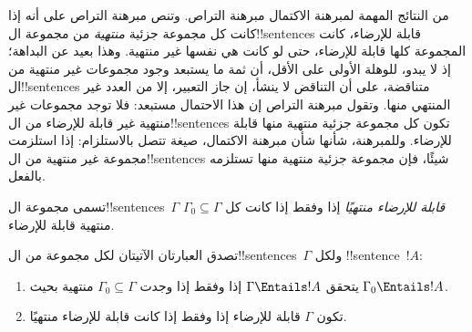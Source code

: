 \documentclass[../../../include/open-logic-section]{subfiles}
\begin{document}
      {}
      {}


من النتائج المهمة لمبرهنة الاكتمال مبرهنة التراص. وتنص مبرهنة التراص
على أنه إذا كانت كل مجموعة جزئية \emph{منتهية} من مجموعة ال!!{sentence}s
قابلة للإرضاء، كانت المجموعة كلها قابلة للإرضاء، حتى لو كانت هي نفسها
غير منتهية. وهذا بعيد عن البداهة؛ إذ لا يبدو، للوهلة الأولى على الأقل،
أن ثمة ما يستبعد وجود مجموعات غير منتهية من ال!!{sentence}s متناقضة،
على أن التناقض لا ينشأ، إن جاز التعبير، إلا من العدد غير المنتهي منها.
وتقول مبرهنة التراص إن هذا الاحتمال مستبعد: فلا توجد مجموعات غير منتهية
غير قابلة للإرضاء من ال!!{sentence}s تكون كل مجموعة جزئية منتهية منها
قابلة للإرضاء. وللمبرهنة، شأنها شأن مبرهنة الاكتمال، صيغة تتصل
بالاستلزام: إذا استلزمت مجموعة غير منتهية من ال!!{sentence}s شيئًا،
فإن مجموعة جزئية منتهية منها تستلزمه بالفعل.

\begin{defn}
  تسمى مجموعة ال!!{sentence}s~$\Gamma$ \emph{قابلة للإرضاء منتهيًا} إذا
  وفقط إذا كانت كل $\Gamma_0 \subseteq \Gamma$ منتهية قابلة للإرضاء.
\end{defn}

\begin{thm}
تصدق العبارتان الآتيتان لكل مجموعة من ال!!{sentence}s~$\Gamma$ ولكل
!!{sentence}~$!A$:
\begin{enumerate}
  \item يتحقق $\Gamma \Entails !A$ إذا وفقط إذا وجدت
    $\Gamma_0 \subseteq \Gamma$ منتهية بحيث $\Gamma_0 \Entails !A$.
  \item تكون $\Gamma$ قابلة للإرضاء إذا وفقط إذا كانت قابلة للإرضاء
    منتهيًا.
\end{enumerate}
\end{thm}
\end{document}
